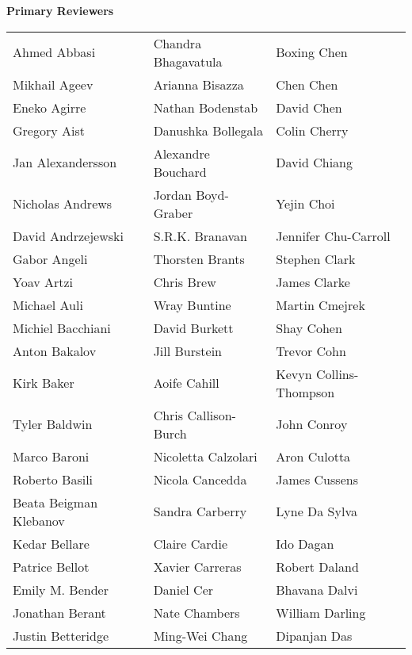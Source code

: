 \vspace{3mm}
{\bf Primary Reviewers}\vspace{2mm} \\
\begin{tabular*}{\textwidth}{@{\extracolsep{\fill}} lll }
  Ahmed Abbasi  & Chandra Bhagavatula  & Boxing Chen \\
  Mikhail Ageev  & Arianna Bisazza  & Chen Chen \\
  Eneko Agirre  & Nathan Bodenstab  & David Chen \\
  Gregory Aist  & Danushka Bollegala  & Colin Cherry \\
  Jan Alexandersson  & Alexandre Bouchard  & David Chiang \\
  Nicholas Andrews  & Jordan Boyd-Graber  & Yejin Choi \\
  David Andrzejewski  & S.R.K. Branavan  & Jennifer Chu-Carroll \\
  Gabor Angeli  & Thorsten Brants  & Stephen Clark \\
  Yoav Artzi  & Chris Brew  & James Clarke \\
  Michael Auli  & Wray Buntine  & Martin Cmejrek \\
  Michiel Bacchiani  & David Burkett  & Shay Cohen \\
  Anton Bakalov  & Jill Burstein  & Trevor Cohn \\
  Kirk Baker  & Aoife Cahill  & Kevyn Collins-Thompson \\
  Tyler Baldwin  & Chris Callison-Burch  & John Conroy \\
  Marco Baroni  & Nicoletta Calzolari  & Aron Culotta \\
  Roberto Basili  & Nicola Cancedda  & James Cussens \\
  Beata Beigman Klebanov  & Sandra Carberry  & Lyne Da Sylva \\
  Kedar Bellare  & Claire Cardie  & Ido Dagan \\
  Patrice Bellot  & Xavier Carreras  & Robert Daland \\
  Emily M. Bender  & Daniel Cer  & Bhavana Dalvi \\
  Jonathan Berant  & Nate Chambers  & William Darling \\
  Justin Betteridge  & Ming-Wei Chang  & Dipanjan Das \\
\end{tabular*}

